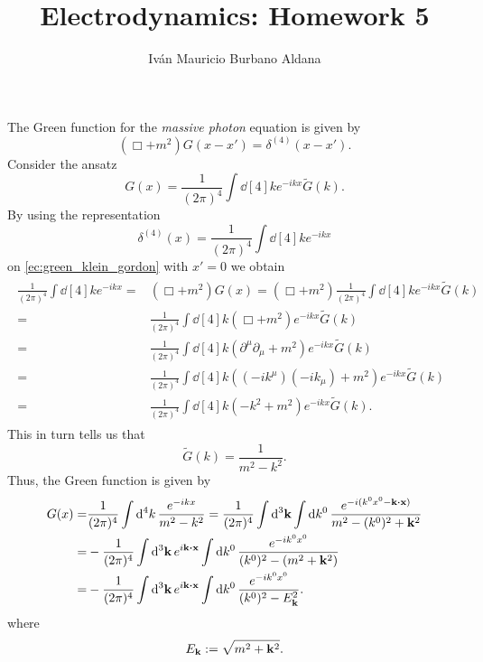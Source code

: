 \documentclass{article}
\title{Electrodynamics: Homework 5}
\author{Iván Mauricio Burbano Aldana}
\begin{document}
\maketitle

The Green function for the \textit{massive photon} equation is given by
\begin{equation}\label{ec:green_klein_gordon}
(\Box+m^2)G(x-x')=\delta^{(4)}(x-x').
\end{equation}
Consider the ansatz 
\begin{equation}
G(x)=\frac{1}{(2\pi)^4}\int \dd[4]{k}e^{-ikx}\tilde{G}(k).
\end{equation}
By using the representation
\begin{equation}
\delta^{(4)}(x)=\frac{1}{(2\pi)^4}\int\dd[4]{k}e^{-ikx}
\end{equation}
on \eqref{ec:green_klein_gordon} with $x'=0$ we obtain
\begin{align}
\begin{split}
\frac{1}{(2\pi)^4}\int\dd[4]{k}e^{-ikx}=&(\Box+m^2)G(x)=(\Box+m^2)\frac{1}{(2\pi)^4}\int \dd[4]{k}e^{-ikx}\tilde{G}(k)\\
=&\frac{1}{(2\pi)^4}\int \dd[4]{k}(\Box+m^2)e^{-ikx}\tilde{G}(k)\\
=&\frac{1}{(2\pi)^4}\int \dd[4]{k}(\partial^\mu\partial_\mu+m^2)e^{-ikx}\tilde{G}(k)\\
=&\frac{1}{(2\pi)^4}\int \dd[4]{k}((-ik^\mu)(-ik_\mu)+m^2)e^{-ikx}\tilde{G}(k)\\
=&\frac{1}{(2\pi)^4}\int \dd[4]{k}(-k^2+m^2)e^{-ikx}\tilde{G}(k).
\end{split}
\end{align}
This in turn tells us that
\begin{equation}
\tilde{G}(k)=\frac{1}{m^2-k^2}.
\end{equation}
Thus, the Green function is given by
\begin{align}\label{ec:green_1}
\begin{split}
G(x)=&\frac{1}{(2\pi)^4}\int \dd[4]{k}\frac{e^{-ikx}}{m^2-k^2}=\frac{1}{(2\pi)^4}\int \dd[3]{\vb{k}}\int\dd{k^0}\frac{e^{-i(k^0x^0-\vb{k}\vdot\vb{x})}}{m^2-(k^0)^2+\vb{k}^2}\\
=&-\frac{1}{(2\pi)^4}\int \dd[3]{\vb{k}}e^{i\vb{k}\vdot\vb{x}}\int\dd{k^0}\frac{e^{-ik^0x^0}}{(k^0)^2-(m^2+\vb{k}^2)}\\
=&-\frac{1}{(2\pi)^4}\int \dd[3]{\vb{k}}e^{i\vb{k}\vdot\vb{x}}\int\dd{k^0}\frac{e^{-ik^0x^0}}{(k^0)^2-E_{\vb{k}}^2}.
\end{split}
\end{align}
where
\begin{equation}
E_{\vb{k}}:=\sqrt{m^2+\vb{k}^2}.
\end{equation}
\end{document}

